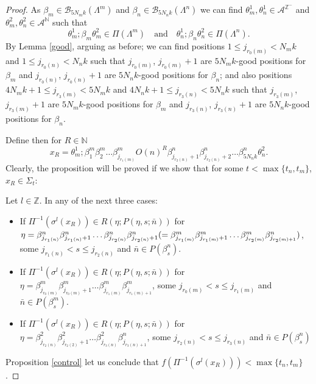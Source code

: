 \documentclass[12pt]{amsart}
\theoremstyle{plain} %
\theoremstyle{definition} %
\numberwithin{equation}{section}
\begin{document}
\begin{proof}
As $\beta_m \in \mathcal{B}_{5N_m k}(\Lambda^{m})$ and $\beta_n \in \mathcal{B}_{5N_n k}(\Lambda^{n})$ we can find $\theta_m^{1}, \theta_n^{1}\in\mathcal{A}^{\mathbb{Z}^-}$ and $\theta_m^{2}, \theta_n^{2}\in\mathcal{A}^{\mathbb{N}}$ such that 
$$\theta_m^{1};\beta_m\theta_m^{2}\in \Pi(\Lambda^{m})\quad \mbox{and} \quad \theta_n^{1};\beta_n\theta_n^{2}\in \Pi(\Lambda^{n}).$$
By Lemma \ref{good}, arguing as before; we can find positions $1\leq j_{r_0(m)}< N_m k$ and $1\leq j_{r_0(n)}< N_n k$ such that $j_{r_0(m)}$, $j_{r_0(m)}+1$ are $5N_m k$-good positions for $\beta_m$ and $j_{r_0(n)}$, $j_{r_0(n)}+1$ are $5N_n k$-good positions for $\beta_n$; and also positions $4N_m k+1\leq j_{r_3(m)}< 5N_m k$ and $4N_n k+1\leq j_{r_3(n)}< 5N_n k$ such that $j_{r_3(m)}$, $j_{r_3(m)}+1$ are $5N_m k$-good positions for $\beta_m$ and $j_{r_3(n)}$, $j_{r_3(n)}+1$ are $5N_n k$-good positions for $\beta_n$.


Define then for $R\in \mathbb{N}$
$$x_R=\theta_m^{1};\beta^m_1\beta^m_2\dots\beta^m_{j_{r_1(m)}}O(n)^R \beta^n_{j_{r_2(n)}+1}\beta^n_{j_{r_2(n)}+2}\dots\beta^n_{5N_n k}\theta_n^{2}.$$
Clearly, the proposition will be proved if we show that for some $t<\max\{t_n,t_m\}$, $x_R\in \Sigma_{t}$:

Let $l\in \mathbb{Z}$. In any of the next three cases:

\begin{itemize}
    \item If $\Pi^{-1}(\sigma^l(x_R))\in R(\eta;P(\eta,s;\bar{n}))$ for $\eta= \beta^n_{j_{r_1(n)}}\beta^n_{j_{r_1(n)}+1}\dots \beta^n_{j_{r_2(n)}} \beta^n_{j_{r_2(n)}+1} (=\\ \beta^m_{j_{r_1(m)}}\beta^m_{j_{r_1(m)}+1}\dots \beta^m_{j_{r_2(m)}} \beta^n_{j_{r_2(m)+1}})$, some $j_{r_1(n)}< s \leq j_{r_2(n)}$ and  $\bar{n} \in P(\beta^n_s)$.
   
   \item If $\Pi^{-1}(\sigma^l(x_R))\in R(\eta;P(\eta,s;\bar{n}))$ for $\eta=\beta^m_{j_{r_0(m)}}\beta^m_{j_{r_0(m)}+1}\dots \beta^m_{j_{r_1(m)}} \beta^m_{j_{r_1(m)+1}}$, some $j_{r_0(m)}< s \leq j_{r_1(m)}$ and  $\bar{n} \in P(\beta^m_s)$.
    
  \item If $\Pi^{-1}(\sigma^l(x_R))\in R(\eta;P(\eta,s;\bar{n}))$ for $\eta=\beta^2_{j_{r_2(n)}}\beta^2_{j_{r_2(2)}+1}\dots \beta^2_{j_{r_3(n)}} \beta^n_{j_{r_3(n)+1}}$, some $j_{r_2(n)}< s \leq j_{r_3(n)}$ and  $\bar{n} \in P(\beta^n_s)$ 


\end{itemize}
Proposition \ref{control} let us conclude that $f(\Pi^{-1}(\sigma^l(x_R)))< \max\{t_n,t_m\}$.
 

\end{proof}
\end{document}
